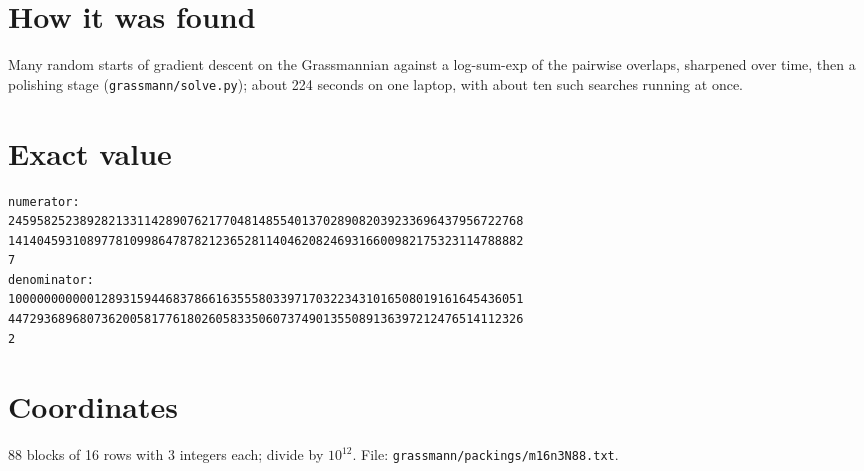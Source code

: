 \documentclass[11pt,a4paper]{article}
\begin{document}
\section{How it was found}
Many random starts of gradient descent on the Grassmannian against a log-sum-exp of the pairwise overlaps, sharpened over time, then a polishing stage (\texttt{grassmann/solve.py}); about 224 seconds on one laptop, with about ten such searches running at once.


\appendix
\section{Exact value}
{\small
\begin{verbatim}
numerator:
245958252389282133114289076217704814855401370289082039233696437956722768
141404593108977810998647878212365281140462082469316600982175323114788882
7
denominator:
100000000000128931594468378661635558033971703223431016508019161645436051
447293689680736200581776180260583350607374901355089136397212476514112326
2
\end{verbatim}}

\section{Coordinates}
88 blocks of 16 rows with 3 integers each; divide by $10^{12}$. File: \texttt{grassmann/packings/m16n3N88.txt}.
{\tiny
\begin{multicols}{3}
\end{multicols}}
\end{document}
